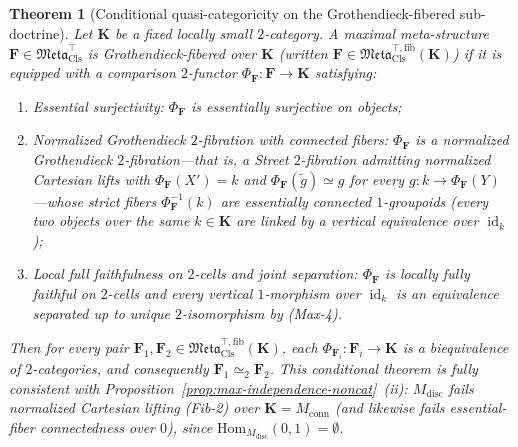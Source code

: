 \documentclass[11pt]{article}
\theoremstyle{plain}
\newtheorem{theorem}{Theorem}[section]
\theoremstyle{definition}
\newcommand{\Meta}{\mathfrak{Meta}}
\newcommand{\Hom}{\mathrm{Hom}}
\DeclareMathOperator{\id}{id}
\begin{document}
\begin{theorem}[Conditional quasi-categoricity on the Grothendieck-fibered sub-doctrine]\label{thm:meta-cat-fib}
Let $\mathbf{K}$ be a fixed locally small $2$-category. A maximal meta-structure $\mathbf{F} \in \Meta_{\mathrm{Cls}}^{\top}$ is \emph{Grothendieck-fibered over $\mathbf{K}$} (written $\mathbf{F} \in \Meta_{\mathrm{Cls}}^{\top,\mathrm{fib}}(\mathbf{K})$) if it is equipped with a comparison $2$-functor $\Phi_{\mathbf{F}} : \mathbf{F} \to \mathbf{K}$ satisfying:
\begin{enumerate}[nosep,label=\textup{(Fib-\arabic*)}]
\item \emph{Essential surjectivity}: $\Phi_{\mathbf{F}}$ is essentially surjective on objects;
\item \emph{Normalized Grothendieck $2$-fibration with connected fibers}: $\Phi_{\mathbf{F}}$ is a normalized Grothendieck $2$-fibration---that is, a Street $2$-fibration admitting normalized Cartesian lifts with $\Phi_{\mathbf{F}}(X') = k$ and $\Phi_{\mathbf{F}}(\tilde{g}) \simeq g$ for every $g : k \to \Phi_{\mathbf{F}}(Y)$---whose strict fibers $\Phi_{\mathbf{F}}^{-1}(k)$ are essentially connected $1$-groupoids (every two objects over the same $k \in \mathbf{K}$ are linked by a vertical equivalence over $\id_k$);
\item \emph{Local full faithfulness on $2$-cells and joint separation}: $\Phi_{\mathbf{F}}$ is locally fully faithful on $2$-cells and every vertical $1$-morphism over $\id_k$ is an equivalence separated up to unique $2$-isomorphism by \textup{(Max-4)}.
\end{enumerate}
Then for every pair $\mathbf{F}_1, \mathbf{F}_2 \in \Meta_{\mathrm{Cls}}^{\top,\mathrm{fib}}(\mathbf{K})$, each $\Phi_{\mathbf{F}_i} : \mathbf{F}_i \to \mathbf{K}$ is a biequivalence of $2$-categories, and consequently $\mathbf{F}_1 \simeq_2 \mathbf{F}_2$. This conditional theorem is fully consistent with Proposition~\ref{prop:max-independence-noncat}~(ii): $M_{\mathrm{disc}}$ fails normalized Cartesian lifting \textup{(Fib-2)} over $\mathbf{K} = M_{\mathrm{conn}}$ (and likewise fails essential-fiber connectedness over $0$), since $\Hom_{M_{\mathrm{disc}}}(0, 1) = \emptyset$.
\end{theorem}
\end{document}
